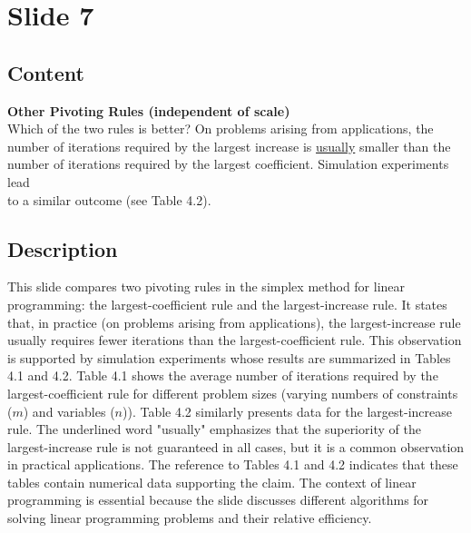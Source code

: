 \documentclass{article}%
\begin{document}
%
\newpage%
\section{Slide 7}%
\label{sec:Slide7}%
\subsection{Content}%

\textbf{Other Pivoting Rules (independent of scale)} \\
Which of the two rules is better? On problems arising from applications, the \\
number of iterations required by the largest increase is \underline{usually} smaller than the \\
number of iterations required by the largest coefficient. Simulation experiments lead \\
to a similar outcome (see Table 4.2).
%
\subsection{Description}%
This slide compares two pivoting rules in the simplex method for linear programming: the largest-coefficient rule and the largest-increase rule.  It states that, in practice (on problems arising from applications), the largest-increase rule usually requires fewer iterations than the largest-coefficient rule. This observation is supported by simulation experiments whose results are summarized in Tables 4.1 and 4.2. Table 4.1 shows the average number of iterations required by the largest-coefficient rule for different problem sizes (varying numbers of constraints ($m$) and variables ($n$)).  Table 4.2 similarly presents data for the largest-increase rule.  The underlined word "usually" emphasizes that the superiority of the largest-increase rule is not guaranteed in all cases, but it is a common observation in practical applications. The reference to Tables 4.1 and 4.2 indicates that these tables contain numerical data supporting the claim. The context of linear programming is essential because the slide discusses different algorithms for solving linear programming problems and their relative efficiency.%
\end{document}
